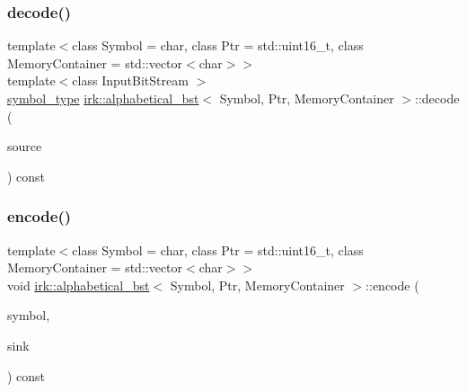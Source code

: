 \mbox{\label{classirk_1_1alphabetical__bst_ad16d9e58c78eafe81f08c20171973cd7}} 
\subsubsection{\texorpdfstring{decode()}{decode()}\hspace{0.1cm}{\footnotesize\ttfamily [2/2]}}
{\footnotesize\ttfamily template$<$class Symbol = char, class Ptr = std\+::uint16\+\_\+t, class Memory\+Container = std\+::vector$<$char$>$$>$ \\
template$<$class Input\+Bit\+Stream $>$ \\
\mbox{\hyperlink{classirk_1_1alphabetical__bst_a296ccb8fa9fa9dce3b3c3beab0a5ca28}{symbol\+\_\+type}} \mbox{\hyperlink{classirk_1_1alphabetical__bst}{irk\+::alphabetical\+\_\+bst}}$<$ Symbol, Ptr, Memory\+Container $>$\+::decode (\begin{DoxyParamCaption}\item[{Input\+Bit\+Stream \&}]{source }\end{DoxyParamCaption}) const\hspace{0.3cm}{\ttfamily [inline]}}

\mbox{\label{classirk_1_1alphabetical__bst_a788eae986e42bf08ba2566927416a367}} 
\subsubsection{\texorpdfstring{encode()}{encode()}\hspace{0.1cm}{\footnotesize\ttfamily [1/3]}}
{\footnotesize\ttfamily template$<$class Symbol = char, class Ptr = std\+::uint16\+\_\+t, class Memory\+Container = std\+::vector$<$char$>$$>$ \\
void \mbox{\hyperlink{classirk_1_1alphabetical__bst}{irk\+::alphabetical\+\_\+bst}}$<$ Symbol, Ptr, Memory\+Container $>$\+::encode (\begin{DoxyParamCaption}\item[{\mbox{\hyperlink{classirk_1_1alphabetical__bst_a296ccb8fa9fa9dce3b3c3beab0a5ca28}{symbol\+\_\+type}}}]{symbol,  }\item[{\mbox{\hyperlink{classirk_1_1output__bit__stream}{output\+\_\+bit\+\_\+stream}} \&}]{sink }\end{DoxyParamCaption}) const\hspace{0.3cm}{\ttfamily [inline]}}

